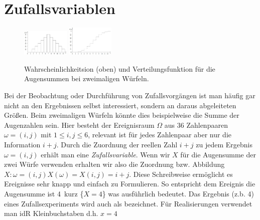 \section{Zufallsvariablen}
\begin{figure}
    \vspace{-10mm}
    \centering
    \includegraphics[width=0.2\textwidth]{images/5.1_f_augensumme.png}
    \includegraphics[width=0.2\textwidth]{images/5.2_F_augensumme.png}
    \caption{Wahrscheinlichkeitsion (oben) und Verteilungsfunktion für die Augensummen bei zweimaligen Würfeln.}
    \vspace{-3mm}
    \label{fig:f_F_dice}
\end{figure}
Bei der Beobachtung oder Durchführung von Zufallsvorgängen ist man häufig gar nicht an den Ergebnissen selbst interessiert, sondern an daraus abgeleiteten Größen. Beim zweimaligen Würfeln könnte dies beispielweise die Summe der Augenzahlen sein. Hier besteht der Ereignisraum $\Omega$ aus 36 Zahlenpaaren $\omega = (i, j)$ mit $1 \le i,j \le 6$, relevant ist für jedes Zahlenpaar aber nur die Information $i + j$. Durch die Zuordnung der reellen Zahl $i + j$ zu jedem Ergebnis $\omega = (i, j)$ erhält man eine \emph{Zufallsvariable}. Wenn wir $X$ für die Augensumme der zwei Würfe verwenden erhalten wir also die Zuordnung bzw. Abbildung $X: \omega = (i, j) X(\omega) = X(i, j) = i + j$. Diese Schreibweise ermöglicht es Ereignisse sehr knapp und einfach zu Formulieren. So entspricht dem Ereignis \glqq die Augensumme ist 4\grqq\, kurz \{$X=4$\} was ausführlich  bedeutet. Das Ergebnis (z.b. 4) eines Zufallsexperiments wird auch als  bezeichnet. Für Realisierungen verwendet man idR Kleinbuchstaben d.h. $x=4$
